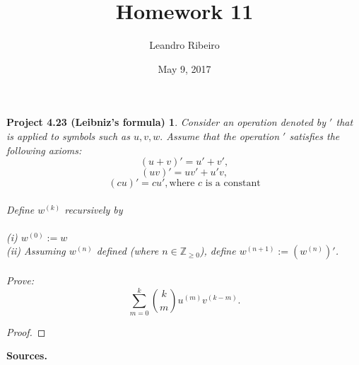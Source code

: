 \documentclass[12pt]{amsart}
\newcommand{\Z}{\mathbb{Z}}
\begin{document}
\title{Homework 11}
\date{May 9, 2017}
\author{Leandro Ribeiro}

\maketitle

\newtheorem*{proj4.23}{Project 4.23 (Leibniz's formula)}

\begin{proj4.23}
	Consider an operation denoted by $'$ that is applied to symbols such as $u,v,w.$ Assume that the operation $'$ satisfies the following axioms:
	$$(u + v)' = u' + v',$$ $$(uv)' = uv' + u'v,$$ $$(cu)' = cu',\textrm{where $c$ is a constant}$$
	\\Define $w^{(k)}$ recursively by \\\\(i) $w^{(0)} := w$ \\(ii) Assuming $w^{(n)}$ defined (where $n \in \Z_{\geq 0}$), define $w^{(n+1)} := (w^{(n)})'$.\\
	\\Prove: $$\sum_{m=0}^k \binom{k}{m}u^{(m)}v^{(k-m)}.$$
\end{proj4.23}

\begin{proof}
\end{proof}
\noindent\textbf{Sources.}
\end{document}

